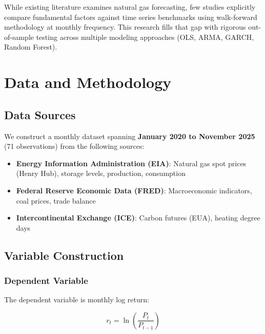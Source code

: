 \documentclass[12pt,a4paper]{article}
\begin{document}
While existing literature examines natural gas forecasting, few studies explicitly compare fundamental factors against time series benchmarks using walk-forward methodology at monthly frequency. This research fills that gap with rigorous out-of-sample testing across multiple modeling approaches (OLS, ARMA, GARCH, Random Forest).


\newpage
\section{Data and Methodology}

\subsection{Data Sources}

We construct a monthly dataset spanning \textbf{January 2020 to November 2025} (71 observations) from the following sources:

\begin{itemize}
    \item \textbf{Energy Information Administration (EIA)}: Natural gas spot prices (Henry Hub), storage levels, production, consumption

    \item \textbf{Federal Reserve Economic Data (FRED)}: Macroeconomic indicators, coal prices, trade balance

    \item \textbf{Intercontinental Exchange (ICE)}: Carbon futures (EUA), heating degree days
\end{itemize}

\subsection{Variable Construction}

\subsubsection{Dependent Variable}

The dependent variable is monthly log return:

\begin{equation}
r_t = \ln\left(\frac{P_t}{P_{t-1}}\right)
\end{equation}
\end{document}
